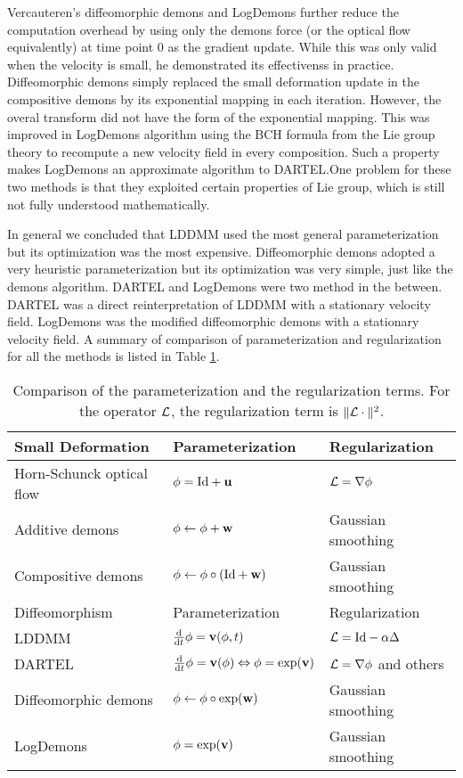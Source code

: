 \documentclass[letterpaper,12pt]{article}
\begin{document}
Vercauteren's diffeomorphic demons and LogDemons further reduce the computation overhead by using only the demons force (or the optical flow equivalently) at time point 0 as the gradient update. While this was only valid when the velocity is small, he demonstrated its effectivenss in practice. Diffeomorphic demons simply replaced the small deformation update in the compositive demons by its exponential mapping in each iteration. However, the overal transform did not have the form of the exponential mapping. This was improved in LogDemons algorithm using the BCH formula from the Lie group theory to recompute a new velocity field in every composition. Such a property makes LogDemons an approximate algorithm to DARTEL.One problem for these two methods is that they exploited certain properties of Lie group, which is still not fully understood mathematically.

In general we concluded that LDDMM used the most general parameterization but its optimization was the most expensive. Diffeomorphic demons adopted a very heuristic parameterization but its optimization was very simple, just like the demons algorithm. DARTEL and LogDemons were two method in the between. DARTEL was a direct reinterpretation of LDDMM with a stationary velocity field. LogDemons was the modified diffeomorphic demons with a stationary velocity field. A summary of comparison of parameterization and regularization for all the methods is listed in Table \ref{tab:comp}.

\begin{table}
\begin{tabular}{|l|l|l|}
\hline
 Small Deformation & Parameterization & Regularization \\
 \hline
 Horn-Schunck optical flow \cite{Horn1981} & $\phi = \text{Id}+\mathbf{u}$ & $ \mathcal{L}=\nabla\phi$ \\
 \hline
 Additive demons \cite{Thirion98,Vercauteren2009} & $\phi \leftarrow \phi+\mathbf{w} $ & Gaussian smoothing\\
\hline
 Compositive demons \cite{Thirion98,Vercauteren2009} & $\phi \leftarrow \phi \circ (\text{Id}+\mathbf{w}) $ & Gaussian smoothing\\
\hline
\hline
 Diffeomorphism & Parameterization & Regularization \\
 \hline
 LDDMM \cite{Beg2005Computing} & $\frac{\text{d}}{\text{d} t} \phi = \mathbf{v}(\phi,t)$ & $ \mathcal{L}=\text{Id}-\alpha\Delta$ \\
 \hline
 DARTEL \cite{Ashburner2007} & $\frac{\text{d}}{\text{d} t} \phi = \mathbf{v}(\phi) \Leftrightarrow \phi = \exp(\mathbf{v})$ & $\mathcal{L}=\nabla\phi$ and others \\
\hline
 Diffeomorphic demons \cite{Vercauteren2009} & $\phi \leftarrow \phi \circ \exp(\mathbf{w}) $ & Gaussian smoothing\\
 \hline
 LogDemons \cite{Vercauteren2008Symmetric} & $\phi = \exp(\mathbf{v}) $ & Gaussian smoothing\\
\hline
\end{tabular}
\caption{\label{tab:comp}
Comparison of the parameterization and the regularization terms. For the operator $\mathcal{L}$, the regularization term is $\|\mathcal{L} \cdot \|^2$.
}
\end{table}
\end{document}
